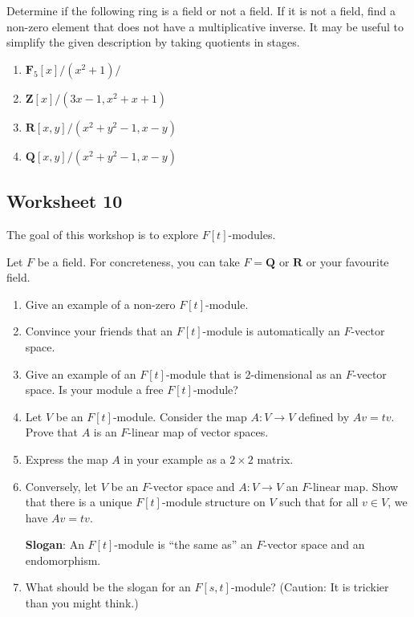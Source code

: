 \documentclass[11pt]{article}
\begin{document}
Determine if the following ring is a field or not a field.  
If it is not a field, find a non-zero element that does not have a multiplicative inverse.
It may be useful to simplify the given description by taking quotients in stages.

\begin{enumerate}
\item \(\mathbf{F}_5[x]/(x^2+1)/\)
\item \(\mathbf{Z}[x]/(3x-1, x^2+x+1)\)
\item \(\mathbf{R}[x,y]/(x^2+y^2-1, x-y)\)
\item \(\mathbf{Q}[x,y]/(x^2+y^2-1, x-y)\)
\end{enumerate}


\subsection{Worksheet 10}
\label{sec:org0750480}
The goal of this workshop is to explore \(F[t]\)-modules.

Let \(F\) be a field.
For concreteness, you can take \(F = \mathbf{Q}\)  or \(\mathbf{R}\) or your favourite field.

\begin{enumerate}
\item Give an example of a non-zero \(F[t]\)-module.
\item Convince your friends that an \(F[t]\)-module is automatically an \(F\)-vector space.
\item Give an example of an \(F[t]\)-module that is 2-dimensional as an \(F\)-vector space.
Is your module a free \(F[t]\)-module?
\item Let \(V\) be an \(F[t]\)-module.
Consider the map \(A \colon V \to V\) defined by \(Av = t v\).
Prove that \(A\) is an \(F\)-linear map of vector spaces.
\item Express the map \(A\) in your example as a \(2 \times 2\) matrix.
\item Conversely, let \(V\) be an \(F\)-vector space and \(A \colon V \to V\) an \(F\)-linear map.
Show that there is a unique \(F[t]\)-module structure on \(V\) such that for all \(v \in V\), we have \(A v = t v\).

\textbf{\textbf{Slogan}}: An \(F[t]\)-module is ``the same as'' an \(F\)-vector space and an endomorphism.

\item What should be the slogan for an \(F[s,t]\)-module? (Caution: It is trickier than you might think.)
\end{enumerate}
\end{document}
